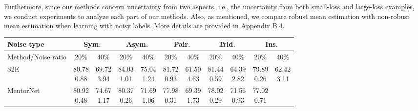 \documentclass[11pt]{article}
\begin{document}
Furthermore, since our methods concern uncertainty from two aspects, i.e., the uncertainty from both small-loss and large-loss examples, we conduct experiments to analyze each part of our methods. Also, as mentioned, we compare robust mean estimation with non-robust mean estimation when learning with noisy labels. More details are provided in Appendix B.4. 



\begin{table}[!htbp]
    \small
\centering
	\begin{tabular}{l |cc|cc|cc|cc|cc} 
		\Xhline{3\arrayrulewidth}	 	
		   Noise type &\multicolumn{2}{c|}{Sym.}&\multicolumn{2}{c|}{Asym.}&\multicolumn{2}{c|}{Pair.}&\multicolumn{2}{c|}{Trid.}&\multicolumn{2}{c}{Ins.}\\
			\hline
		   Method/Noise ratio&  20\% & 40\%& 20\% & 40\% &20\% & 40\%& 20\% & 40\% & 20\% & 40\%\\
			\hline
			S2E & \makecell{80.78\\ \scriptsize{0.88}}
			& \makecell{69.72\\ \scriptsize{3.94}}
			& \makecell{84.03\\ \scriptsize{1.01}}
			& \makecell{75.04\\ \scriptsize{1.24}}
			& \makecell{81.72\\ \scriptsize{0.93}}
			& \makecell{61.50\\ \scriptsize{4.63}}
			& \makecell{81.44\\ \scriptsize{0.59}}
			& \makecell{64.39\\ \scriptsize{2.82}}
			& \makecell{79.89\\ \scriptsize{0.26}}
			& \makecell{62.42\\ \scriptsize{3.11}}\\
			\hline
			MentorNet & \makecell{80.92\\ \scriptsize{0.48}} 
			& \makecell{74.67\\ \scriptsize{1.17}}
			& \makecell{80.37\\ \scriptsize{0.26}}
			& \makecell{71.69\\ \scriptsize{1.06}}
			& \makecell{77.98\\ \scriptsize{0.31}}
			& \makecell{69.39\\ \scriptsize{1.73}}
			& \makecell{78.02\\ \scriptsize{0.29}}
			& \makecell{71.56\\ \scriptsize{0.93}}
			& \makecell{77.02\\ \scriptsize{0.71}}

\end{tabular}
\end{table}
\end{document}
